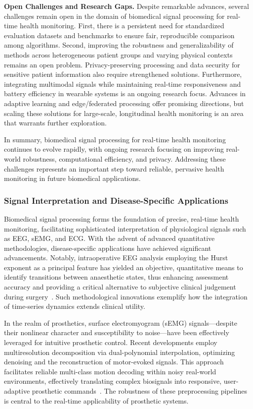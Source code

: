 \documentclass[sigconf]{acmart}
\begin{document}
\textbf{Open Challenges and Research Gaps.} Despite remarkable advances, several challenges remain open in the domain of biomedical signal processing for real-time health monitoring. First, there is a persistent need for standardized evaluation datasets and benchmarks to ensure fair, reproducible comparison among algorithms. Second, improving the robustness and generalizability of methods across heterogeneous patient groups and varying physical contexts remains an open problem. Privacy-preserving processing and data security for sensitive patient information also require strengthened solutions. Furthermore, integrating multimodal signals while maintaining real-time responsiveness and battery efficiency in wearable systems is an ongoing research focus. Advances in adaptive learning and edge/federated processing offer promising directions, but scaling these solutions for large-scale, longitudinal health monitoring is an area that warrants further exploration.

In summary, biomedical signal processing for real-time health monitoring continues to evolve rapidly, with ongoing research focusing on improving real-world robustness, computational efficiency, and privacy. Addressing these challenges represents an important step toward reliable, pervasive health monitoring in future biomedical applications.

\subsubsection{Signal Interpretation and Disease-Specific Applications}

Biomedical signal processing forms the foundation of precise, real-time health monitoring, facilitating sophisticated interpretation of physiological signals such as EEG, sEMG, and ECG. With the advent of advanced quantitative methodologies, disease-specific applications have achieved significant advancements. Notably, intraoperative EEG analysis employing the Hurst exponent as a principal feature has yielded an objective, quantitative means to identify transitions between anaesthetic states, thus enhancing assessment accuracy and providing a critical alternative to subjective clinical judgement during surgery~\cite{ref96}. Such methodological innovations exemplify how the integration of time-series dynamics extends clinical utility.

In the realm of prosthetics, surface electromyogram (sEMG) signals—despite their nonlinear character and susceptibility to noise—have been effectively leveraged for intuitive prosthetic control. Recent developments employ multiresolution decomposition via dual-polynomial interpolation, optimizing denoising and the reconstruction of motor-evoked signals. This approach facilitates reliable multi-class motion decoding within noisy real-world environments, effectively translating complex biosignals into responsive, user-adaptive prosthetic commands~\cite{ref97}. The robustness of these preprocessing pipelines is central to the real-time applicability of prosthetic systems.
\end{document}
